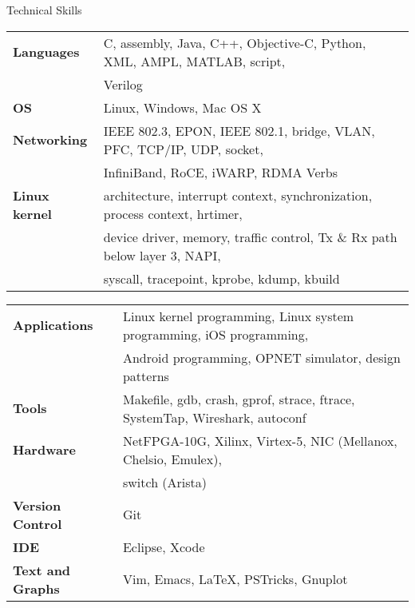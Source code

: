 \documentclass{resume} %
\begin{document}
\begin{rSection}{Technical Skills}

\begin{tabular}{ @{} >{\bfseries}l @{\hspace{6ex}} l }
Languages & C, assembly, Java, C++, Objective-C, Python, XML, AMPL, MATLAB, script, \\
& Verilog \\
OS & Linux, Windows, Mac OS X \\
Networking & IEEE 802.3, EPON, IEEE 802.1, bridge, VLAN, PFC, TCP/IP, UDP, socket, \\
& InfiniBand, RoCE, iWARP, RDMA Verbs \\
Linux kernel & architecture, interrupt context, synchronization, process context, hrtimer, \\
& device driver, memory, traffic control, Tx \& Rx path below layer 3, NAPI, \\
& syscall, tracepoint, kprobe, kdump, kbuild \\
\end{tabular}

\begin{tabular}{ @{} >{\bfseries}l @{\hspace{6ex}} l }
Applications & Linux kernel programming, Linux system programming, iOS programming, \\
& Android programming, OPNET simulator, design patterns \\
Tools & Makefile, gdb, crash, gprof, strace, ftrace, SystemTap, Wireshark, autoconf \\
Hardware & NetFPGA-10G, Xilinx, Virtex-5, NIC (Mellanox, Chelsio, Emulex), \\
& switch (Arista) \\
Version Control & Git \\
IDE & Eclipse, Xcode  \\
Text and Graphs & Vim, Emacs, \LaTeX, PSTricks, Gnuplot
\end{tabular}

\end{rSection}



\end{document}
